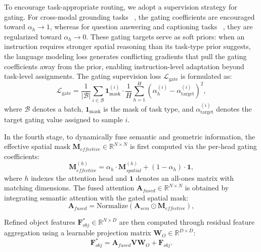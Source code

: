 \documentclass[lettersize,journal]{IEEEtran}
\begin{document}
To encourage task-appropriate routing, we adopt a supervision strategy for gating. For cross-modal grounding tasks {~\cite{scanrefer2020, multi3drefer2023}}, the gating coefficients are encouraged toward $\alpha_h \rightarrow 1$, whereas for question answering and captioning tasks {~\cite{scanqa2022,scan2cap2021}}, they are regularized toward $\alpha_h \rightarrow 0$. These gating targets serve as soft priors: when an instruction requires stronger spatial reasoning than its task-type prior suggests, the language modeling loss generates conflicting gradients that pull the gating coefficients away from the prior, enabling instruction-level adaptation beyond task-level assignments. The gating supervision loss $\mathcal{L}_{\text{gate}}$ is formulated as:
\begin{equation}
\mathcal{L}_{\text{gate}} = \frac{1}{|\mathcal{B}|} \sum_{i \in \mathcal{B}} \mathbf{1}_{\text{mask}}^{(i)} \cdot \frac{1}{H} \sum_{h=1}^{H} (\alpha_h^{(i)} - \alpha_{\text{target}}^{(i)})^2,
\label{eq:gate_loss}
\end{equation}
where $\mathcal{B}$ denotes a batch, $\mathbf{1}_{\text{mask}}$ is the mask of task type, and $\alpha_{\text{target}}^{(i)}$ denotes the target gating value assigned to sample $i$.

In the fourth stage, to dynamically fuse semantic and geometric information, the effective spatial mask $\mathbf{M}_{effective} \in \mathbb{R}^{N \times N}$ is first computed via the per-head gating coefficients:
\begin{equation}
\mathbf{M}_{effective}^{(h)} = \alpha_h \cdot \mathbf{M}_{spatial}^{(h)} + (1 - \alpha_h) \cdot \mathbf{1},
\end{equation}
where $h$ indexes the attention head and $\mathbf{1}$ denotes an all-ones matrix with matching dimensions. The fused attention $\mathbf{A}_{fused} \in \mathbb{R}^{N \times N}$ is obtained by integrating semantic attention with the gated spatial mask:
\begin{equation}
\mathbf{A}_{fused} = \text{Normalize}(\mathbf{A}_{sem} \odot \mathbf{M}_{effective}),
\end{equation}

Refined object features $\mathbf{F}_{obj}^{*} \in \mathbb{R}^{N \times D}$ are then computed through residual feature aggregation using a learnable projection matrix $\mathbf{W}_O \in \mathbb{R}^{D \times D}$:
\begin{equation}
\mathbf{F}_{obj}^{*}
=
\mathbf{A}_{fused}\mathbf{V}\mathbf{W}_O
+
\mathbf{F}_{obj}.
\end{equation}
\end{document}
